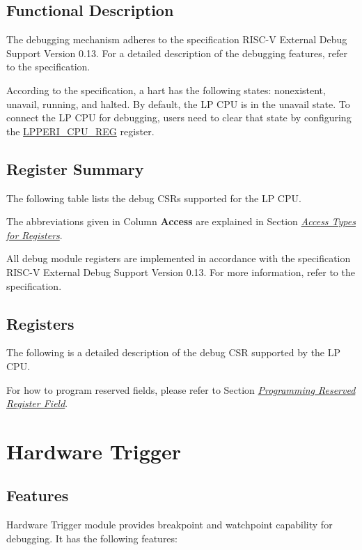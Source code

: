 \documentclass[main\_\_EN.tex]{subfiles}
\begin{document}
\subsection{Functional Description}
The debugging mechanism adheres to the specification RISC-V External Debug Support Version 0.13. For a detailed description of the debugging features, refer to the specification.

According to the specification, a hart has the following states: nonexistent, unavail, running, and halted. By default, the LP CPU is in the unavail state. To connect the LP CPU for debugging, users need to clear that state by configuring the \hyperref[regdesc:LPPERICPUREG]{LPPERI\_CPU\_REG} register.

\subsection{Register Summary}

The following table lists the debug CSRs supported for the LP CPU.

The abbreviations given in Column \textbf{Access} are explained in Section \hyperref[glossary-access-types]{\textit{Access Types for Registers}}.



All debug module registers are implemented in accordance with the specification RISC-V External Debug Support Version 0.13. For more information, refer to the specification.

\subsection{Registers}
The following is a detailed description of the debug CSR supported by the LP CPU.

For how to program reserved fields, please refer to Section \hyperref[programming-reserved-field]{\textit{Programming Reserved Register Field}}.




\section{Hardware Trigger}\label{sec:ulp-trigger}

\subsection{Features}
Hardware Trigger module provides breakpoint and watchpoint capability for debugging. It has the following features:
\end{document}

